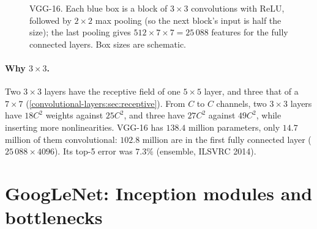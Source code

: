 \begin{notechapter}
\begin{figure}[ht]
\centering
{}
\caption{VGG-16. Each blue box is a block of $3\times3$ convolutions with ReLU, followed by $2\times2$ max
pooling (so the next block's input is half the size); the last pooling gives $512\times7\times7 = 25\,088$
features for the fully connected layers. Box sizes are schematic.}
\label{cnn-architectures:fig:vgg}
\end{figure}

\paragraph{Why $3\times3$.} Two $3\times3$ layers have the receptive field of one $5\times5$ layer, and three that of a $7\times7$
(\cref{convolutional-layers:sec:receptive}). From $C$ to $C$ channels, two $3\times3$ layers have $18C^2$ weights
against $25C^2$, and three have $27C^2$ against $49C^2$, while inserting more nonlinearities. VGG-16 has
$138.4$ million parameters, only $14.7$ million of them convolutional: $102.8$ million are in the first
fully connected layer ($25\,088\times4096$). Its top-5 error was $7.3\%$ (ensemble, ILSVRC 2014).

\section{GoogLeNet: Inception modules and bottlenecks}\label{cnn-architectures:sec:inception}


\end{notechapter}
